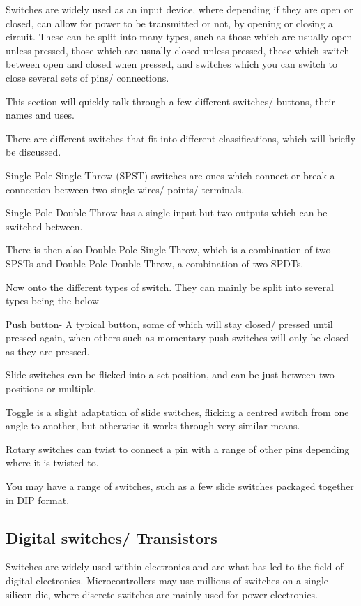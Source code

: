 \documentclass[a4paper,11pt]{report}
\begin{document}
Switches are widely used as an input device, where depending if they are open or closed, can allow for power to be transmitted or not, by opening or closing a circuit. These can be split into many types, such as those which are usually open unless pressed, those which are usually closed unless pressed, those which switch between open and closed when pressed, and switches which you can switch to close several sets of pins/ connections.

This section will quickly talk through a few different switches/ buttons, their names and uses.

There are different switches that fit into different classifications, which will briefly be discussed.

Single Pole Single Throw (SPST) switches are ones which connect or break a connection between two single wires/ points/ terminals.

Single Pole Double Throw has a single input but two outputs which can be switched between.

There is then also Double Pole Single Throw, which is a combination of two SPSTs and Double Pole Double Throw, a combination of two SPDTs.

Now onto the different types of switch. They can mainly be split into several types being the below-

Push button- A typical button, some of which will stay closed/ pressed until pressed again, when others such as momentary push switches will only be closed as they are pressed.

Slide switches can be flicked into a set position, and can be just between two positions or multiple.

Toggle is a slight adaptation of slide switches, flicking a centred switch from one angle to another, but otherwise it works through very similar means.

Rotary switches can twist to connect a pin with a range of other pins depending where it is twisted to.

You may have a range of switches, such as a few slide switches packaged together in DIP format.

\subsection{Digital switches/ Transistors}

Switches are widely used within electronics and are what has led to the field of digital electronics. Microcontrollers may use millions of switches on a single silicon die, where discrete switches are mainly used for power electronics.
\end{document}

